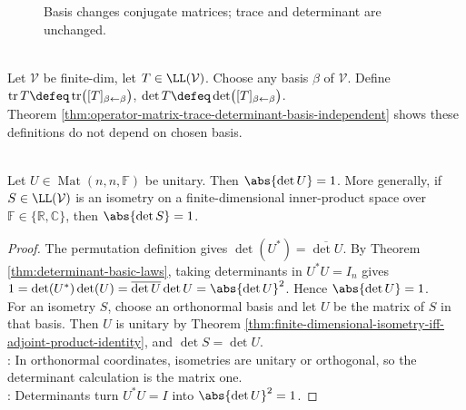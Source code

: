 \begin{figure}[H]
  \centering
  
  \caption{Basis changes conjugate matrices; trace and determinant are unchanged.}
  \label{fig:operator-trace-determinant-basis-invariance}
\end{figure}

\begin{definition} \label{def:operator-trace-and-determinant} \\
Let $\mathcal{V}$ be finite-dim, let $T\in\LL(\mathcal{V})$. Choose any basis $\beta$ of $\mathcal{V}$. Define $\operatorname{tr}T\defeq\operatorname{tr}\bigl([T]_{\beta\leftarrow\beta}\bigr)$, $\det T\defeq\det\bigl([T]_{\beta\leftarrow\beta}\bigr)$.\\
Theorem \ref{thm:operator-matrix-trace-determinant-basis-independent} shows these definitions do not depend on chosen basis.
\end{definition}

\begin{proposition} \label{prop:isometry-determinant-absolute-one} \\
Let $U\in\operatorname{Mat}(n,n,\mathbb{F})$ be unitary. Then $\abs{\det U}=1$. More generally, if $S\in\LL(\mathcal{V})$ is an isometry on a finite-dimensional inner-product space over $\mathbb{F}\in\{\mathbb{R},\mathbb{C}\}$, then $\abs{\det S}=1$.
\begin{proof}
The permutation definition gives $\det(U^*)=\overline{\det U}$. By Theorem \ref{thm:determinant-basic-laws}, taking determinants in $U^*U=I_n$ gives $1=\det(U^*)\det(U)=\overline{\det U}\det U=\abs{\det U}^2$. Hence $\abs{\det U}=1$.\\
For an isometry $S$, choose an orthonormal basis and let $U$ be the matrix of $S$ in that basis. Then $U$ is unitary by Theorem \ref{thm:finite-dimensional-isometry-iff-adjoint-product-identity}, and $\det S=\det U$.\\
: In orthonormal coordinates, isometries are unitary or orthogonal, so the determinant calculation is the matrix one.\\
: Determinants turn $U^*U=I$ into $\abs{\det U}^2=1$.
\end{proof}
\end{proposition}

